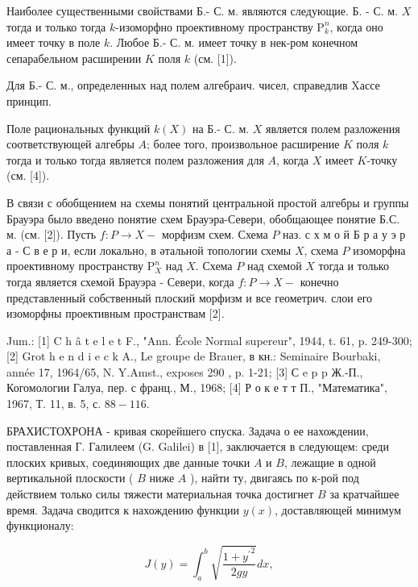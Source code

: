 \documentclass[10pt]{article}
\begin{document}
Наиболее существенными свойствами Б.- С. м. являются следующие. Б. - С. м. $X$ тогда и только тогда $k$-изоморфно проективному пространству $\mathrm{P}_{k}^{n}$, когда оно имеет точку в поле $k$. Любое Б.- С. м. имеет точку в нек-ром конечном сепарабельном расширении $K$ поля $k$ (см. [1]).



Для Б.- С. м., определенных над полем алгебраич. чисел, справедлив Xассе принцип.



Поле рациональных функций $k(X)$ на Б.- С. м. $X$ является полем разложения соответствующей алгебры $A$; более того, произвольное расширение $K$ поля $k$ тогда и только тогда является полем разложения для $A$, когда $X$ имеет $K$-точку (см. [4]).



В связи с обобщением на схемы понятий центральной простой алгебры и группы Брауэра было введено понятие схем Брауэра-Севери, обобщающее понятие Б.С. м. (см. [2]). Пусть $f: P \rightarrow X-$ морфизм схем. Схема $P$ наз. с х м о й Б р а у э р а - С в е р и, если локально, в әтальной топологии схемы $X$, схема $P$ изоморфна проективному пространству $\mathrm{P}_{X}^{n}$ над $X$. Схема $P$ над схемой $X$ тогда и только тогда является схемой Брауэра - Севери, когда $f: P \rightarrow X-$ конечно представленный собственный плоский морфизм и все геометрич. слои его изоморфны проективным пространствам [2].



Jum.: [1] C h â t e l e t F., "Ann. École Normal supereur", 1944, t. 61, p. 249-300; [2] Grot h e n d i e c k A., Le groupe de Brauer, в кн.: Seminaire Bourbaki, année 17, 1964/65, N. Y.Amst., exposes 290 , p. 1-21; [3] С e p p Ж.-П., Когомологии Галуа, пер. с франц., М., 1968; [4] Р о к е т т П., "Математика", 1967, Т. 11, в. 5, с. $88-116$.



БРАХИСТОХРОНА - кривая скорейшего спуска. Задача о ее нахождении, поставленная Г. Галилеем (G. Galilei) в [1], заключается в следующем: среди плоских кривых, соединяющих две данные точки $A$ и $B$, лежащие в одной вертикальной плоскости ( $B$ ниже $A$ ), найти ту, двигаясь по к-рой под действием только силы тяжести материальная точка достигнет $B$ за кратчайшее время. Задача сводится к нахождению функции $y(x)$, доставляющей минимум функционалу:



\[

J(y)=\int_{a}^{b} \sqrt{\frac{1+{y^{\prime}}^{2}}{2 g y}} d x,

\]
\end{document}
